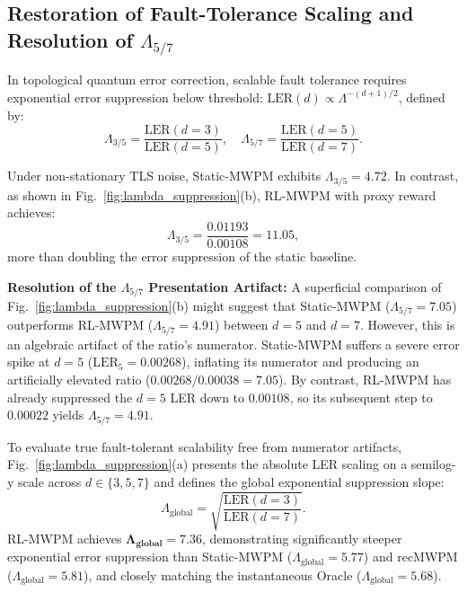 \documentclass[aps,prxquantum,reprint,superscriptaddress,floatfix,nofootinbib]{revtex4-2}
\begin{document}
\subsection{Restoration of Fault-Tolerance Scaling and Resolution of $\Lambda_{5/7}$}
\label{subsec:lambda_scaling}
In topological quantum error correction, scalable fault tolerance requires exponential error suppression below threshold: $\text{LER}(d) \propto \Lambda^{-(d+1)/2}$, defined by:
\begin{equation}
    \Lambda_{3/5} = \frac{\text{LER}(d=3)}{\text{LER}(d=5)}, \quad \Lambda_{5/7} = \frac{\text{LER}(d=5)}{\text{LER}(d=7)}.
    \label{eq:lambda_def}
\end{equation}

Under non-stationary TLS noise, Static-MWPM exhibits $\Lambda_{3/5} = 4.72$. In contrast, as shown in Fig.~\ref{fig:lambda_suppression}(b), RL-MWPM with proxy reward achieves:
\begin{equation}
    \Lambda_{3/5} = \frac{0.01193}{0.00108} = \mathbf{11.05},
\end{equation}
more than doubling the error suppression of the static baseline.

\textbf{Resolution of the $\Lambda_{5/7}$ Presentation Artifact:} A superficial comparison of Fig.~\ref{fig:lambda_suppression}(b) might suggest that Static-MWPM ($\Lambda_{5/7} = 7.05$) outperforms RL-MWPM ($\Lambda_{5/7} = 4.91$) between $d=5$ and $d=7$. However, this is an algebraic artifact of the ratio's numerator. Static-MWPM suffers a severe error spike at $d=5$ ($\text{LER}_5 = 0.00268$), inflating its numerator and producing an artificially elevated ratio ($0.00268 / 0.00038 = 7.05$). By contrast, RL-MWPM has already suppressed the $d=5$ LER down to $0.00108$, so its subsequent step to $0.00022$ yields $\Lambda_{5/7} = 4.91$.

To evaluate true fault-tolerant scalability free from numerator artifacts, Fig.~\ref{fig:lambda_suppression}(a) presents the absolute LER scaling on a semilog-y scale across $d \in \{3, 5, 7\}$ and defines the global exponential suppression slope:
\begin{equation}
    \Lambda_{\text{global}} = \sqrt{\frac{\text{LER}(d=3)}{\text{LER}(d=7)}}.
\end{equation}
RL-MWPM achieves $\mathbf{\Lambda_{\text{global}} = 7.36}$, demonstrating significantly steeper exponential error suppression than Static-MWPM ($\Lambda_{\text{global}} = 5.77$) and recMWPM ($\Lambda_{\text{global}} = 5.81$), and closely matching the instantaneous Oracle ($\Lambda_{\text{global}} = 5.68$).
\end{document}
